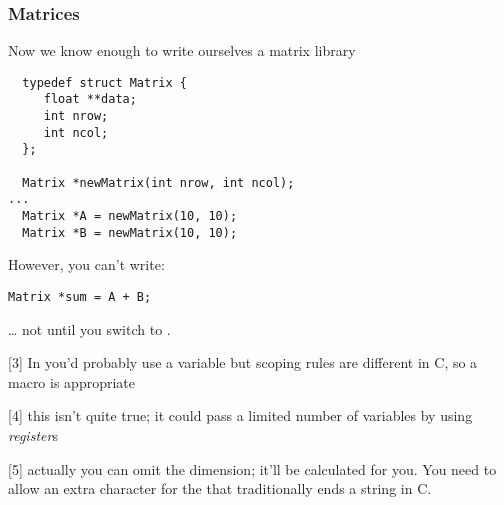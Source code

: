 \documentclass[10pt, t]{beamer}
\begin{document}
\begin{frame}[fragile]
\frametitle{Matrices}
\label{sec-5_1_23}

Now we know enough to write ourselves a matrix library
\begin{verbatim}
  typedef struct Matrix {
     float **data;
     int nrow;
     int ncol;
  };
  
  Matrix *newMatrix(int nrow, int ncol);
...
  Matrix *A = newMatrix(10, 10);
  Matrix *B = newMatrix(10, 10);
\end{verbatim}

\pause
However, you can't write:
\begin{verbatim}
Matrix *sum = A + B;
\end{verbatim}
\pause \ldots{} not until you switch to \CPP.








[3] In \CPP you'd probably use a  variable but scoping rules are different in C, so a macro is appropriate

[4] this isn't quite true;  it could pass a limited number of variables by using \textit{register}s

[5] actually you can omit the dimension;
 it'll be calculated for you. You need to allow an extra character for the  that traditionally ends a string in C.
\end{frame}
\end{document}
